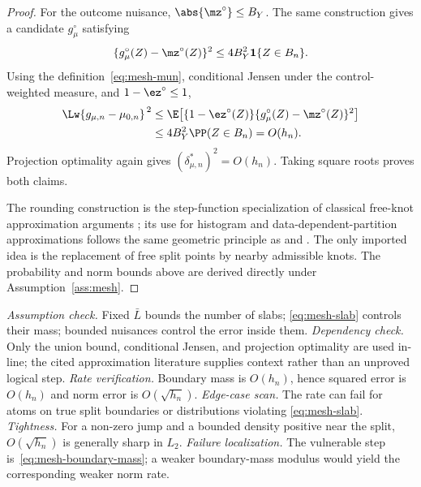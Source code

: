 \begin{proof}
For the outcome nuisance, $\abs{\mz^\circ}\le B_Y$.  The same construction
gives a candidate $g^\circ_\mu$ satisfying
\[
  \{g^\circ_\mu(Z)-\mz^\circ(Z)\}^2
  \le 4B_Y^2\mathbf1\{Z\in B_n\}.
\]
Using the definition~\eqref{eq:mesh-mun}, conditional Jensen under the
control-weighted measure, and $1-\ez^\circ\le1$,
\begin{align}
  \Lw{g_{\mu,n}-\mzn}^{\,2}
  &\le
  \E\!\left[
    \{1-\ez^\circ(Z)\}
    \{g^\circ_\mu(Z)-\mz^\circ(Z)\}^{2}
  \right] \\
  &\le 4B_Y^2\PP(Z\in B_n)
  =O(h_n).
\end{align}
Projection optimality again gives
$(\delta^*_{\mu,n})^2=O(h_n)$.  Taking square roots proves both claims.

The rounding construction is the step-function specialization of classical
free-knot approximation arguments
\citep{deboor1973,barrowsmith1978}; its use for histogram and
data-dependent-partition approximations follows the same geometric principle
as \citet{nobel1996} and \citet{lugosinobel1996}.  The only imported idea is
the replacement of free split points by nearby admissible knots.  The
probability and norm bounds above are derived directly under
Assumption~\ref{ass:mesh}.
\end{proof}

\begin{remark}
\emph{Assumption check.}
Fixed $\bar L$ bounds the number of slabs; \eqref{eq:mesh-slab} controls their
mass; bounded nuisances control the error inside them.
\emph{Dependency check.}
Only the union bound, conditional Jensen, and projection optimality are used
in-line; the cited approximation literature supplies context rather than an
unproved logical step.
\emph{Rate verification.}
Boundary mass is $O(h_n)$, hence squared error is $O(h_n)$ and norm error is
$O(\sqrt{h_n})$.
\emph{Edge-case scan.}
The rate can fail for atoms on true split boundaries or distributions violating
\eqref{eq:mesh-slab}.
\emph{Tightness.}
For a non-zero jump and a bounded density positive near the split,
$O(\sqrt{h_n})$ is generally sharp in $L_2$.
\emph{Failure localization.}
The vulnerable step is~\eqref{eq:mesh-boundary-mass}; a weaker boundary-mass
modulus would yield the corresponding weaker norm rate.
\end{remark}


